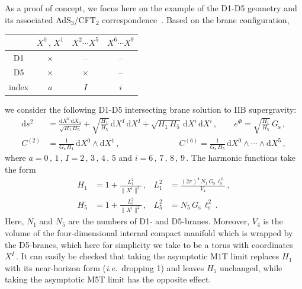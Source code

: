 \documentclass[11pt]{article}
\renewcommand{\emph}[1]{\textit{#1}}
\newcommand{\dd}{\mathrm{d}}
\begin{document}
As a proof of concept, we focus here on the example of the D1-D5 geometry and its associated AdS${}_3$/CFT${}_2$ correspondence~\cite{Maldacena:1997re}. Based on the brane configuration,
%
\begin{center}
\begin{tabular}{c|c|c|c}
& $X^0\,,\, X^1$  & $X^2 \cdots X^{5}$ & $X^6 \cdots X^9$ \\[2pt]
\hline 
D1 & $\times$ & -- & -- \\[2pt]
D5 & $\times$ & $\times$ & -- \\[2pt]
\hline
index & $a$ & $I$ & $i$
\end{tabular}
\end{center}
%
we consider the following D1-D5 intersecting brane solution to IIB supergravity:
%
\begin{subequations} \label{eq:d1d5}
\begin{align}
    \dd s^2 & = \frac{\dd X^a \, \dd X_a}{\sqrt{H_1 \, H_5}} + \sqrt{\frac{H_1}{H_5}} \, \dd X^I \, \dd X^I + \sqrt{H_1 \, H_5} \, \dd X^i \, \dd X^i \,,
        \qquad%
    e^\Phi = \sqrt{\frac{H_1}{H_5}} \, G^{}_\text{s}\,, \\[4pt]
    C^{(2)} & = \frac{1}{G^{}_\text{s} \, H_1} \, \dd X^0 \wedge \dd X^1 \,,
        \hspace{3cm}%
    C^{(6)} = \frac{1}{G^{}_\text{s} \, H_5} \, \dd X^0 \wedge \cdots \wedge \dd X^5 \,,
\end{align}
\end{subequations}
%
where $a=0\,,\,1$\,, $I=2\,,\,3\,,\,4\,,\,5$ and $i=6\,,\,7\,,\,8\,,\,9$\,. The harmonic functions take the form
%
\begin{subequations}
\begin{align}
    H_1 &= 1 + \frac{L_1^2}{\|X^i\|^2} \,,  
        &%
    L_1^2 &= \frac{(2\pi)^4 \, N^{}_1 \, G^{}_\text{s} \, \ell_\text{s}^{\,6}}{V^{}_4}\,, \\[4pt]
    H_5 &= 1 + \frac{L_5^2}{\|X^i\|^2} \,,
        &%
    L_5^2 &= N_5 \, G_\text{s} \, \ell_\text{s}^2\,.
\end{align}
\end{subequations}
Here, $N_1$ and $N_5$ are the numbers of D1- and D5-branes. Moreover, $V_4$ is the volume of the four-dimensional internal compact manifold which is wrapped by the D5-branes, which here for simplicity we take to be a torus with coordinates $X^I$\,.
It can easily be checked that taking the asymptotic M$1$T limit replaces $H_1$ with its near-horizon form (\emph{i.e.}~dropping 1) and leaves $H_5$ unchanged, while taking the asymptotic M5T limit has the opposite effect. 
\end{document}
